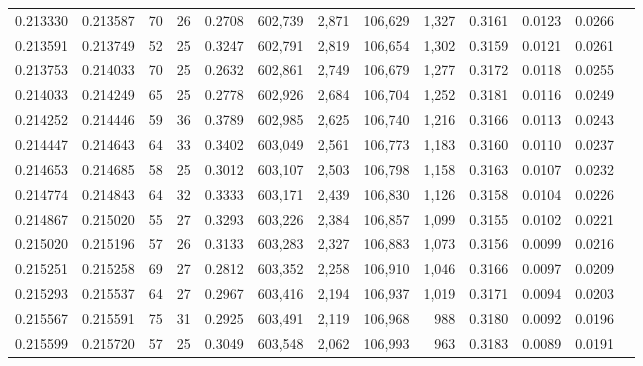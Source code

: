 \begin{tabular}{rrrrrrrrrrrrr}
0.213330 & 0.213587 &    70 &  26 &                                     0.2708 & 602,739 &   2,871 & 106,629 &   1,327 & 0.3161 & 0.0123 & 0.0266 \\
0.213591 & 0.213749 &    52 &  25 &                                     0.3247 & 602,791 &   2,819 & 106,654 &   1,302 & 0.3159 & 0.0121 & 0.0261 \\
0.213753 & 0.214033 &    70 &  25 &                                     0.2632 & 602,861 &   2,749 & 106,679 &   1,277 & 0.3172 & 0.0118 & 0.0255 \\
0.214033 & 0.214249 &    65 &  25 &                                     0.2778 & 602,926 &   2,684 & 106,704 &   1,252 & 0.3181 & 0.0116 & 0.0249 \\
0.214252 & 0.214446 &    59 &  36 &                                     0.3789 & 602,985 &   2,625 & 106,740 &   1,216 & 0.3166 & 0.0113 & 0.0243 \\
0.214447 & 0.214643 &    64 &  33 &                                     0.3402 & 603,049 &   2,561 & 106,773 &   1,183 & 0.3160 & 0.0110 & 0.0237 \\
0.214653 & 0.214685 &    58 &  25 &                                     0.3012 & 603,107 &   2,503 & 106,798 &   1,158 & 0.3163 & 0.0107 & 0.0232 \\
0.214774 & 0.214843 &    64 &  32 &                                     0.3333 & 603,171 &   2,439 & 106,830 &   1,126 & 0.3158 & 0.0104 & 0.0226 \\
0.214867 & 0.215020 &    55 &  27 &                                     0.3293 & 603,226 &   2,384 & 106,857 &   1,099 & 0.3155 & 0.0102 & 0.0221 \\
0.215020 & 0.215196 &    57 &  26 &                                     0.3133 & 603,283 &   2,327 & 106,883 &   1,073 & 0.3156 & 0.0099 & 0.0216 \\
0.215251 & 0.215258 &    69 &  27 &                                     0.2812 & 603,352 &   2,258 & 106,910 &   1,046 & 0.3166 & 0.0097 & 0.0209 \\
0.215293 & 0.215537 &    64 &  27 &                                     0.2967 & 603,416 &   2,194 & 106,937 &   1,019 & 0.3171 & 0.0094 & 0.0203 \\
0.215567 & 0.215591 &    75 &  31 &                                     0.2925 & 603,491 &   2,119 & 106,968 &     988 & 0.3180 & 0.0092 & 0.0196 \\
0.215599 & 0.215720 &    57 &  25 &                                     0.3049 & 603,548 &   2,062 & 106,993 &     963 & 0.3183 & 0.0089 & 0.0191 \\

\end{tabular}
